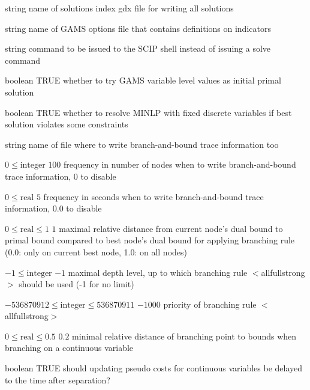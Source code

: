 %
{string}%
{}%
{name of solutions index gdx file for writing all solutions}%
{}

%
{string}%
{}%
{name of GAMS options file that contains definitions on indicators}%
{}

%
{string}%
{}%
{command to be issued to the SCIP shell instead of issuing a solve command}%
{}

%
{boolean}%
{TRUE}%
{whether to try GAMS variable level values as initial primal solution}%
{}

%
{boolean}%
{TRUE}%
{whether to resolve MINLP with fixed discrete variables if best solution violates some constraints}%
{}

%
{string}%
{}%
{name of file where to write branch-and-bound trace information too}%
{}

%
{$0\leq\textrm{integer}$}%
{$100$}%
{frequency in number of nodes when to write branch-and-bound trace information, 0 to disable}%
{}

%
{$0\leq\textrm{real}$}%
{$5$}%
{frequency in seconds when to write branch-and-bound trace information, 0.0 to disable}%
{}

%
{$0\leq\textrm{real}\leq1$}%
{$1$}%
{maximal relative distance from current node's dual bound to primal bound compared to best node's dual bound for applying branching rule (0.0: only on current best node, 1.0: on all nodes)}%
{}

%
{$-1\leq\textrm{integer}$}%
{$-1$}%
{maximal depth level, up to which branching rule $<$allfullstrong$>$ should be used (-1 for no limit)}%
{}

%
{$-536870912\leq\textrm{integer}\leq536870911$}%
{$-1000$}%
{priority of branching rule $<$allfullstrong$>$}%
{}

%
{$0\leq\textrm{real}\leq0.5$}%
{$0.2$}%
{minimal relative distance of branching point to bounds when branching on a continuous variable}%
{}

%
{boolean}%
{TRUE}%
{should updating pseudo costs for continuous variables be delayed to the time after separation?}%
{}

